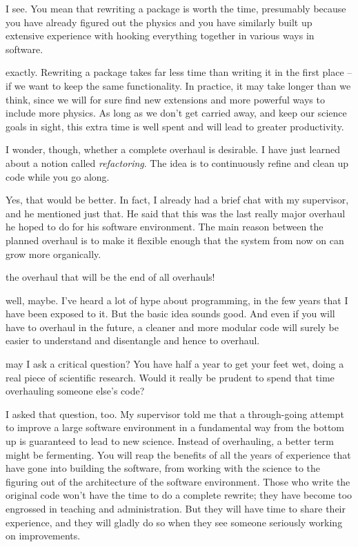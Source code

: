 \documentclass{book}
\def\alice{\item[Alice:]}
\def\bob{\item[Bob:]}
\def\carol{\item[Carol:]}
\begin{document}
\bob
I see.  You mean that rewriting a package is worth the time,
presumably because you have already figured out the physics and you
have similarly built up extensive experience with hooking everything
together in various ways in software.

\alice
exactly.  Rewriting a package takes far less time than writing
it in the first place -- if we want to keep the same functionality.
In practice, it may take longer than we think, since we will for sure
find new extensions and more powerful ways to include more physics.
As long as we don't get carried away, and keep our science goals in
sight, this extra time is well spent and will lead to greater
productivity.

\carol
I wonder, though, whether a complete overhaul is desirable.  I
have just learned about a notion called {\it refactoring}.  The idea
is to continuously refine and clean up code while you go along.

\alice
Yes, that would be better.  In fact, I already had a brief chat
with my supervisor, and he mentioned just that.  He said that this was
the last really major overhaul he hoped to do for his software
environment.  The main reason between the planned overhaul is to make
it flexible enough that the system from now on can grow more
organically.

\bob
the overhaul that will be the end of all overhauls!

\carol
well, maybe.  I've heard a lot of hype about programming, in
the few years that I have been exposed to it.  But the basic idea
sounds good.  And even if you will have to overhaul in the future, a
cleaner and more modular code will surely be easier to understand and
disentangle and hence to overhaul.

\bob
may I ask a critical question?  You have half a year to get your
feet wet, doing a real piece of scientific research.  Would it really
be prudent to spend that time overhauling someone else's code?

\alice
I asked that question, too.  My supervisor told me that a
through-going attempt to improve a large software environment in a
fundamental way from the bottom up is guaranteed to lead to new
science.  Instead of overhauling, a better term might be fermenting.
You will reap the benefits of all the years of experience that have
gone into building the software, from working with the science to the
figuring out of the architecture of the software environment.  Those
who write the original code won't have the time to do a complete
rewrite; they have become too engrossed in teaching and administration.
But they will have time to share their experience, and they will
gladly do so when they see someone seriously working on improvements.
\end{document}
